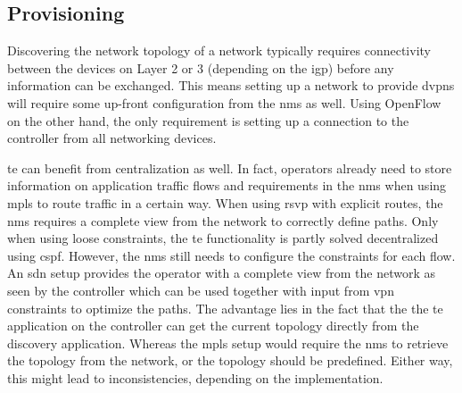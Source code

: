 



\subsection{Provisioning} %
\label{sub:provisioning}

Discovering the network topology of a network typically requires connectivity between the devices on Layer 2 or 3 (depending on the \ac{igp}) before any information can be exchanged. This means setting up a network to provide \acp{dvpn} will require some up-front configuration from the \ac{nms} as well. Using OpenFlow on the other hand, the only requirement is setting up a connection to the controller from all networking devices. 

\acl{te} can benefit from centralization as well. In fact, operators already need to store information on application traffic flows and requirements in the \ac{nms} when using \ac{mpls} to route traffic in a certain way. When using \ac{rsvp} with explicit routes, the \ac{nms} requires a complete view from the network to correctly define paths. Only when using loose constraints, the \ac{te} functionality is partly solved decentralized using \ac{cspf}. However, the \ac{nms} still needs to configure the constraints for each flow. An \ac{sdn} setup provides the operator with a complete view from the network as seen by the controller which can be used together with input from \ac{vpn} constraints to optimize the paths. The advantage lies in the fact that the the \ac{te} application on the controller can get the current topology directly from the discovery application. Whereas the \ac{mpls} setup would require the \ac{nms} to retrieve the topology from the network, or the topology should be predefined. Either way, this might lead to inconsistencies, depending on the implementation.

